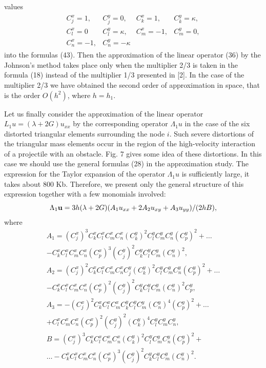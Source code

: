 values
\begin{eqnarray}
\begin{array}{llll}
C_j^x=1,  &  C_j^y=0,  & C_k^x=1,  &  C_k^y=\kappa, \\
C_l^x=0   &C_l^y=\kappa,&C_m^x=-1, &  C_m^y=0,      \\
C_n^x=-1, &C_n^y=-\kappa&~         &  ~
\end{array}
\end{eqnarray}
into the formulas (43). Then the approximation of the linear operator (36) by
the Johnson's method takes place only when the multiplier 2/3 is taken in the
formula (18) instead of the multiplier 1/3 presented in [2]. In the case of the
multiplier 2/3 we have obtained the second order of approximation in space,
that is the order $O(h^2)$, where $h=h_1$.

    Let us finally consider the approximation of the linear operator
$L_1u=(\lambda+2G)u_{xx}$ by the corresponding operator $\Lambda_1 u$ in the
case of the six distorted triangular elements surrounding the node $i$. Such
severe distortions of the triangular mass elements occur in the region of the
high-velocity interaction of a projectile with an obstacle. Fig. 7 gives some
idea of these distortions. In this case we should use the general formulas (28)
in the approximation study. The expression for the Taylor expansion of the
operator $\Lambda_1 u$ is sufficiently large, it takes about 800 Kb. Therefore,
we present only the general structure of this expression together with a few
monomials involved:
\begin{equation}
\Lambda_1{\bf u}=3h(\lambda+2G)(A_1u_{xx}+2A_2u_{xy}+A_3u_{yy})/(2hB),
\end{equation}
where
\begin{eqnarray}
A_1=(C_j^x)^3C_k^xC_l^xC_m^xC_n^x(C_k^y)^2C_l^yC_m^yC_n^y(C_p^y)^2 +\ldots
\nonumber\\
- C_k^xC_l^xC_m^xC_n^x(C_p^x)^3(C_j^y)^2C_k^yC_l^yC_m^y(C_n^y)^2,\nonumber\\
A_2=(C_j^x)^2C_k^xC_l^xC_m^xC_n^xC_j^y(C_k^y)^2C_l^yC_m^yC_n^y(C_p^y)^2 +
\ldots \nonumber\\
-C_k^xC_l^xC_m^xC_n^x(C_p^x)^2(C_j^y)^2C_k^yC_l^yC_m^y(C_n^y)^2C_p^y,
\nonumber\\
A_3=-(C_j^x)^2C_k^xC_l^xC_m^xC_k^yC_l^yC_m^y(C_n^y)^4(C_p^y)^2 + \ldots
\nonumber\\
+C_l^xC_m^xC_n^x(C_p^x)^2(C_j^y)^2(C_k^y)^4C_l^yC_m^yC_n^y,\nonumber\\
B=(C_j^x)^3C_k^xC_l^xC_m^xC_n^x(C_k^y)^2C_l^yC_m^yC_n^y(C_p^y)^2 +\nonumber\\
\ldots -C_k^xC_l^xC_m^xC_n^x(C_p^x)^3(C_j^y)^2C_k^yC_l^yC_m^y(C_n^y)^2.
\end{eqnarray}
